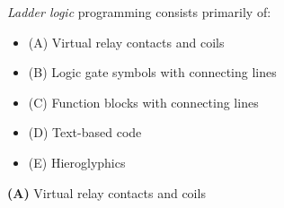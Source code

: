 

{\it Ladder logic} programming consists primarily of:

\begin{itemize}
\item{(A)} Virtual relay contacts and coils
\vskip 5pt 
\item{(B)} Logic gate symbols with connecting lines
\vskip 5pt 
\item{(C)} Function blocks with connecting lines
\vskip 5pt 
\item{(D)} Text-based code
\vskip 5pt 
\item{(E)} Hieroglyphics
\end{itemize}







{\bf (A)} Virtual relay contacts and coils
 










